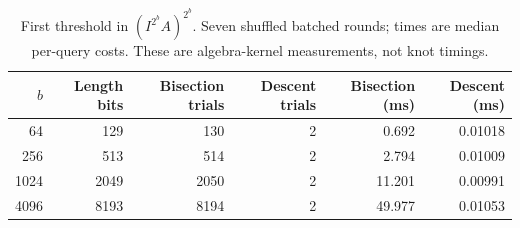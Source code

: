 \begin{table}[htbp]
\centering\small
\begin{tabular}{rrrrrr}
\toprule
$b$ & Length bits & Bisection trials & Descent trials & Bisection (ms) & Descent (ms)\\
\midrule
64 & 129 & 130 & 2 & 0.692 & 0.01018\\
256 & 513 & 514 & 2 & 2.794 & 0.01009\\
1024 & 2049 & 2050 & 2 & 11.201 & 0.00991\\
4096 & 8193 & 8194 & 2 & 49.977 & 0.01053\\
\bottomrule
\end{tabular}
\caption{First threshold in $(I^{2^b}A)^{2^b}$. Seven shuffled batched rounds; times are median per-query costs. These are algebra-kernel measurements, not knot timings.}
\label{tab:threshold}
\end{table}
